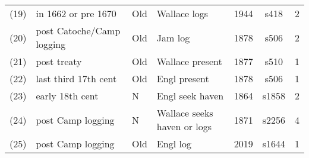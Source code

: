 \begin{table}
\begin{sideways}
\begin{tabular}{cp{.35\textheight}lp{.2\textheight}ccc}
(19)	&in 1662	or pre 1670&Old	&Wallace logs	&1944	&s418	&2\\ %
(20)	&post Catoche/Camp logging	&Old	&Jam log	&1878	&s506	&2\\ %
(21)	&post treaty	&Old	&Wallace present	&1877	&s510	&1\\ %
(22)	&last third 17th cent	&Old	&Engl present	&1878	&s506	&1\\ %
(23)	&early 18th cent	&N	&Engl seek haven	&1864	&s1858	&2\\ %
(24)	&post Camp logging	&N	&Wallace seeks haven or logs	&1871	&s2256	&4\\ %
(25)	&post Camp logging	&Old	&Engl log	&2019	&s1644	&1 %
\end{tabular}
\end{sideways}
\end{table}
%
